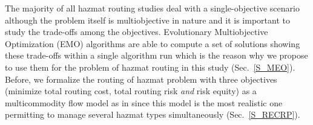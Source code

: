 \documentclass[preprint,12pt]{elsarticle}
\newcommand{\TODON}[1]{{\color{blue}TODO: #1}}
\begin{document}
The majority of all hazmat routing studies deal with a single-objective scenario although the problem itself is multiobjective in nature and it is important to study the trade-offs among the objectives. Evolutionary Multiobjective Optimization (EMO) algorithms are able to compute a set of solutions showing these trade-offs within a single algorithm run which is the reason why we propose to use them for the problem of hazmat routing in this study (Sec.~\ref{S_MEO}). Before, we formalize the routing of hazmat problem with three objectives (minimize total routing cost, total routing risk {\em and} risk equity) as a multicommodity flow model as in \cite{CAR08} since this model is the most realistic one permitting to manage several hazmat types simultaneously (Sec.~\ref{S_RECRP}).




\end{document}
